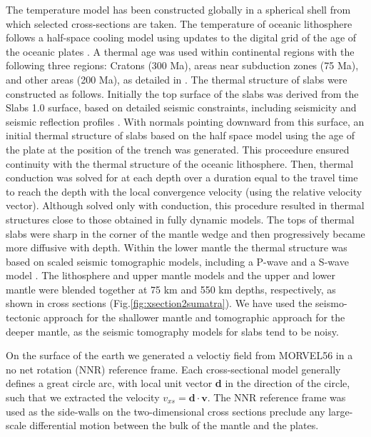 \documentclass[12pt]{article}
\begin{document}
{The temperature model has been constructed globally in a spherical shell from which selected cross-sections are taken. The temperature of oceanic lithosphere follows a half-space cooling model using  updates to the digital grid of the age of the oceanic plates \citep{muller1997digital}.  
A thermal age was used within continental regions with the following three regions: Cratons (300 Ma), areas near subduction zones (75 Ma), and other areas (200 Ma), as detailed in \citep{Stadler27082010}.
The thermal structure of slabs were constructed as follows. 
Initially the top surface of the slabs was derived from the Slabs 1.0 surface, based on detailed seismic constraints, including seismicity and seismic reflection profiles \citep{Hayes2012}.
With normals pointing downward from this surface, an initial thermal structure of slabs based on the half space model using the age of the plate at the position of the trench was generated. This proceedure ensured continuity with the thermal structure of the oceanic lithosphere. Then, thermal conduction was solved for at each depth over a duration equal to the travel time to reach the depth with the local convergence velocity (using the relative velocity vector). Although solved only with conduction, this procedure resulted in thermal structures close to those obtained in fully dynamic models. The tops of thermal  slabs were sharp in the corner of the mantle wedge and then progressively became more diffusive with depth.
Within the lower mantle the thermal structure was based on scaled seismic tomographic models,
including a P-wave \citep{simmons2012llnl} and a S-wave model \citep{ritsema1999complex}.
The lithosphere and upper mantle models and the upper and lower mantle were blended together at 75 km and 550 km depths, respectively, as shown in cross sections (Fig.\ref{fig:xsection2sumatra}).
We have used the seismo-tectonic approach for the shallower mantle and tomographic approach for the deeper mantle, as the seismic tomography models for slabs tend to be noisy.


On the surface of the earth we generated a veloctiy field from MORVEL56 \citep{GGGE2060} in a no net rotation (NNR) reference frame. Each cross-sectional model generally defines a great circle arc, with local unit vector \textbf{d} in the direction of the circle, such that we extracted the velocity $v_{xs}=\textbf{d}\cdot\textbf{v}$.  The NNR reference frame was used as the side-walls on the two-dimensional cross sections preclude any large-scale differential motion between the bulk of the mantle and the plates.






}
\end{document}
